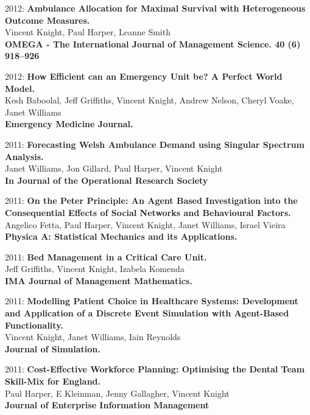 \documentclass[10pt]{res} %
\begin{document}
\begin{resume}
\begin{etaremune}
\item
2012: \textbf{Ambulance Allocation for Maximal Survival with Heterogeneous Outcome Measures.}\\
Vincent Knight, Paul Harper, Leanne Smith
\\
\textbf{OMEGA - The International Journal of Management Science. 40 (6) 918--926}
\\

\item
2012: \textbf{How Efficient can an Emergency Unit be? A Perfect World Model.}\\
Kesh Baboolal, Jeff Griffiths, Vincent Knight, Andrew Nelson, Cheryl Voake, Janet Williams
\\
\textbf{Emergency Medicine Journal.}
\\

\item
2011: \textbf{Forecasting Welsh Ambulance Demand using Singular Spectrum Analysis.}\\
Janet Williams, Jon Gillard, Paul Harper, Vincent Knight
\\
\textbf{In Journal of the Operational Research Society}
\\

\item
2011: \textbf{On the Peter Principle: An Agent Based Investigation into the Consequential Effects of Social Networks and Behavioural Factors.}\\
Angelico Fetta, Paul Harper, Vincent Knight, Janet Williams, Israel Vieira
\\
\textbf{Physica A: Statistical Mechanics and its Applications.}
\\

\item
2011: \textbf{Bed Management in a Critical Care Unit.}\\
Jeff Griffiths, Vincent Knight, Izabela Komenda
\\
\textbf{IMA Journal of Management Mathematics.}
\\

\item
2011: \textbf{Modelling Patient Choice in Healthcare Systems: Development and Application of a Discrete Event Simulation with Agent-Based Functionality.}\\
Vincent Knight, Janet Williams, Iain Reynolds
\\
\textbf{Journal of Simulation.}
\\

\item
2011: \textbf{Cost-Effective Workforce Planning: Optimising the Dental Team Skill-Mix for England.}\\
Paul Harper, E Kleinman, Jenny Gallagher, Vincent Knight
\\
\textbf{Journal of Enterprise Information Management}
\\


\end{etaremune}
\end{resume}
\end{document}
